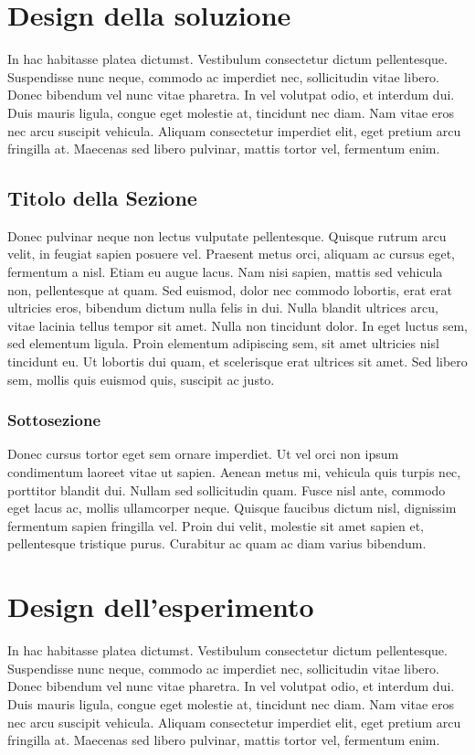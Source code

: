 \documentclass[target=mst,aauheader=,style=]{thud}
\begin{document}
\chapter{Design della soluzione}
In hac habitasse platea dictumst. Vestibulum consectetur dictum pellentesque. Suspendisse nunc neque, commodo ac imperdiet nec, sollicitudin vitae libero. Donec bibendum vel nunc vitae pharetra. In vel volutpat odio, et interdum dui. Duis mauris ligula, congue eget molestie at, tincidunt nec diam. Nam vitae eros nec arcu suscipit vehicula. Aliquam consectetur imperdiet elit, eget pretium arcu fringilla at. Maecenas sed libero pulvinar, mattis tortor vel, fermentum enim.

\section{Titolo della Sezione}
Donec pulvinar neque non lectus vulputate pellentesque. Quisque rutrum arcu velit, in feugiat sapien posuere vel. Praesent metus orci, aliquam ac cursus eget, fermentum a nisl. Etiam eu augue lacus. Nam nisi sapien, mattis sed vehicula non, pellentesque at quam. Sed euismod, dolor nec commodo lobortis, erat erat ultricies eros, bibendum dictum nulla felis in dui. Nulla blandit ultrices arcu, vitae lacinia tellus tempor sit amet. Nulla non tincidunt dolor. In eget luctus sem, sed elementum ligula. Proin elementum adipiscing sem, sit amet ultricies nisl tincidunt eu. Ut lobortis dui quam, et scelerisque erat ultrices sit amet. Sed libero sem, mollis quis euismod quis, suscipit ac justo.

\subsection{Sottosezione}
Donec cursus tortor eget sem ornare imperdiet. Ut vel orci non ipsum condimentum laoreet vitae ut sapien. Aenean metus mi, vehicula quis turpis nec, porttitor blandit dui. Nullam sed sollicitudin quam. Fusce nisl ante, commodo eget lacus ac, mollis ullamcorper neque. Quisque faucibus dictum nisl, dignissim fermentum sapien fringilla vel. Proin dui velit, molestie sit amet sapien et, pellentesque tristique purus. Curabitur ac quam ac diam varius bibendum.

\chapter{Design dell'esperimento}
In hac habitasse platea dictumst. Vestibulum consectetur dictum pellentesque. Suspendisse nunc neque, commodo ac imperdiet nec, sollicitudin vitae libero. Donec bibendum vel nunc vitae pharetra. In vel volutpat odio, et interdum dui. Duis mauris ligula, congue eget molestie at, tincidunt nec diam. Nam vitae eros nec arcu suscipit vehicula. Aliquam consectetur imperdiet elit, eget pretium arcu fringilla at. Maecenas sed libero pulvinar, mattis tortor vel, fermentum enim.
\end{document}
